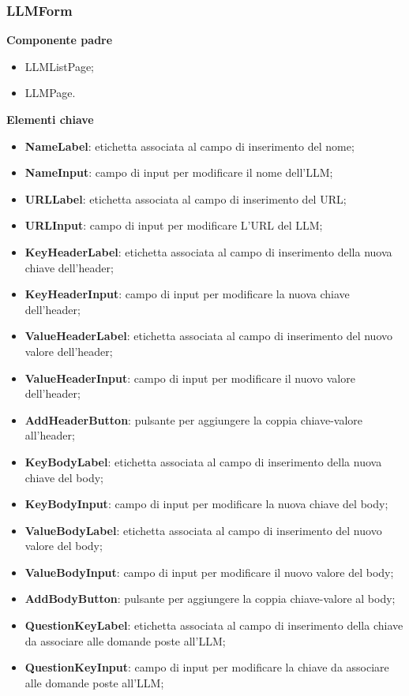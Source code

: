 \subsubsection{LLMForm}
\textbf{Componente padre}
\begin{itemize}
    \item LLMListPage;
    \item LLMPage.
\end{itemize}
\textbf{Elementi chiave}
\begin{itemize}
    \item \textbf{NameLabel}: etichetta associata al campo di inserimento del nome;
    \item \textbf{NameInput}: campo di input per modificare il nome dell'LLM;
    \item \textbf{URLLabel}: etichetta associata al campo di inserimento del URL;
    \item \textbf{URLInput}: campo di input per modificare L'URL del LLM;
    \item \textbf{KeyHeaderLabel}: etichetta associata al campo di inserimento della nuova chiave dell'header;
    \item \textbf{KeyHeaderInput}: campo di input per modificare la nuova chiave dell'header;
    \item \textbf{ValueHeaderLabel}: etichetta associata al campo di inserimento del nuovo valore dell'header;
    \item \textbf{ValueHeaderInput}: campo di input per modificare il nuovo valore dell'header;
    \item \textbf{AddHeaderButton}: pulsante per aggiungere la coppia chiave-valore all'header;
    \item \textbf{KeyBodyLabel}: etichetta associata al campo di inserimento della nuova chiave del body;
    \item \textbf{KeyBodyInput}: campo di input per modificare la nuova chiave del body;
    \item \textbf{ValueBodyLabel}: etichetta associata al campo di inserimento del nuovo valore del body;
    \item \textbf{ValueBodyInput}: campo di input per modificare il nuovo valore del body;
    \item \textbf{AddBodyButton}: pulsante per aggiungere la coppia chiave-valore al body;
    \item \textbf{QuestionKeyLabel}: etichetta associata al campo di inserimento della chiave da associare alle domande poste all'LLM;
    \item \textbf{QuestionKeyInput}: campo di input per modificare la chiave da associare alle domande poste all'LLM;

\end{itemize}
